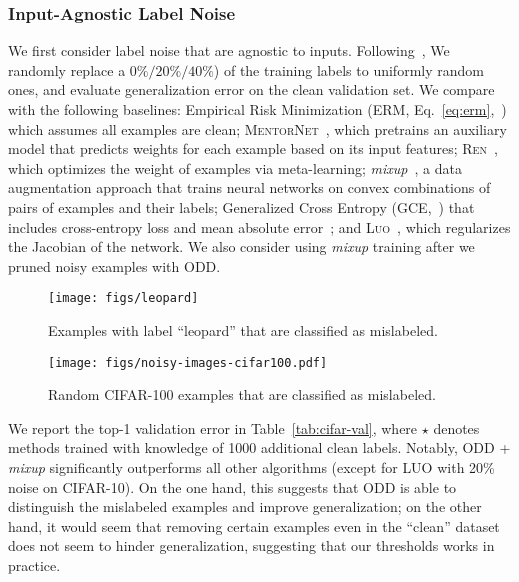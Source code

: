 \documentclass[a4paper,11pt]{article}
\begin{document}
\subsubsection{Input-Agnostic Label Noise}

We first consider label noise that are agnostic to inputs. 
Following~\cite{zhang2016understanding}, We randomly replace a $0\% / 20\% / 40\%$) of the training labels to uniformly random ones, and evaluate generalization error on the clean validation set.
We compare with the following baselines: Empirical Risk Minimization (\textsc{ERM}, Eq.~\ref{eq:erm},~\cite{goyal2017accurate}) which assumes all examples are clean; \textsc{MentorNet}~\cite{jiang2017mentornet}, which pretrains an auxiliary model that predicts weights for each example based on its input features; \textsc{Ren}~\cite{ren2018learning}, which optimizes the weight of examples via meta-learning; \textit{mixup}~\cite{zhang2017mixup}, a data augmentation approach that trains neural networks on convex combinations of pairs of examples and their labels; Generalized Cross Entropy (\textsc{GCE},~\cite{zhang2018generalized}) that includes cross-entropy loss and mean absolute error~\cite{ghosh2017robust}; and \textsc{Luo}~\cite{luo2019simple}, which regularizes the Jacobian of the network. We also consider using \textit{mixup} training after we pruned noisy examples with \textsc{ODD}. 

\begin{figure*}[tbp]
    \centering
    \texttt{[image: figs/leopard]}
    \caption{Examples with label ``leopard'' that are classified as mislabeled.}
    \label{fig:leopard}
\end{figure*}




\begin{figure*}[tbp]
    \centering
    \texttt{[image: figs/noisy-images-cifar100.pdf]}
    \caption{Random CIFAR-100 examples that are classified as mislabeled.}
    \label{fig:noisy-images-cifar100-t}
\end{figure*}












We report the top-1 validation error in Table~\ref{tab:cifar-val}, where $\star$ denotes methods trained with knowledge of 1000 additional clean labels. Notably, \textsc{ODD} + \textit{mixup} significantly outperforms all other algorithms (except for \textsc{LUO} with 20\% noise on CIFAR-10). On the one hand, this suggests that \textsc{ODD} is able to distinguish the mislabeled examples and improve generalization; on the other hand, it would seem that removing certain examples even in the ``clean'' dataset does not seem to hinder generalization, suggesting that our thresholds works in practice.
\end{document}

